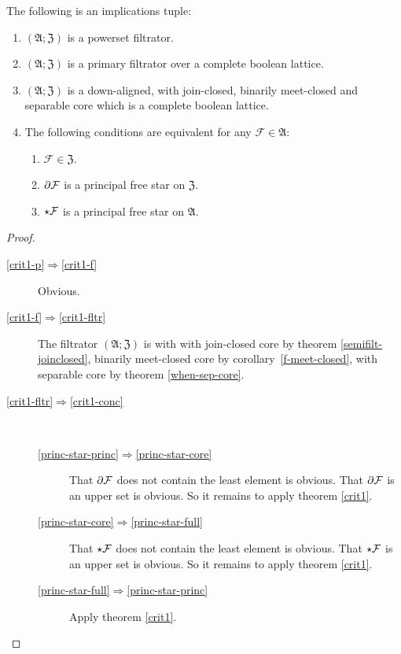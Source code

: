 \begin{prop}
\label{compl-eq-princ}The following is an implications tuple:
\begin{enumerate}
\item \label{crit1-p-1}$(\mathfrak{A};\mathfrak{Z})$ is a powerset filtrator.
\item \label{crit1-f-1}$(\mathfrak{A};\mathfrak{Z})$ is a primary filtrator
over a complete boolean lattice.
\item \label{crit1-fltr-1}$(\mathfrak{A};\mathfrak{Z})$ is a down-aligned,
with join-closed, binarily meet-closed and separable core which is
a complete boolean lattice.
\item \label{crit1-conc-1}The following conditions are equivalent for any
$\mathcal{F}\in\mathfrak{A}$:

\begin{enumerate}
\item \label{princ-star-princ}$\mathcal{F}\in\mathfrak{Z}$.
\item \label{princ-star-core}$\partial\mathcal{F}$ is a principal free
star on $\mathfrak{Z}$.
\item \label{princ-star-full}$\star\mathcal{F}$ is a principal free
star on $\mathfrak{A}$.
\end{enumerate}
\end{enumerate}
\end{prop}
\begin{proof}
~
\begin{description}
\item [{\ref{crit1-p}$\Rightarrow$\ref{crit1-f}}] Obvious.
\item [{\ref{crit1-f}$\Rightarrow$\ref{crit1-fltr}}] The filtrator $(\mathfrak{A};\mathfrak{Z})$
is with with join-closed core by theorem \ref{semifilt-joinclosed},
binarily meet-closed core by corollary~\ref{f-meet-closed}, with
separable core by theorem \ref{when-sep-core}.
\item [{\ref{crit1-fltr}$\Rightarrow$\ref{crit1-conc}}] ~

\begin{description}
\item [{\ref{princ-star-princ}$\Rightarrow$\ref{princ-star-core}}] That
$\partial\mathcal{F}$ does not contain the least element is obvious.
That $\partial\mathcal{F}$ is an upper set is obvious. So it remains
to apply theorem \ref{crit1}.
\item [{\ref{princ-star-core}$\Rightarrow$\ref{princ-star-full}}] That
$\star\mathcal{F}$ does not contain the least element is obvious.
That $\star\mathcal{F}$ is an upper set is obvious. So it remains
to apply theorem \ref{crit1}.
\item [{\ref{princ-star-full}$\Rightarrow$\ref{princ-star-princ}}] Apply
theorem \ref{crit1}.
\end{description}
\end{description}
\end{proof}
